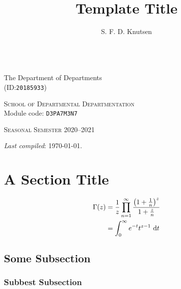\documentclass[11pt,a4paper,twoside]{article}
\title{Template Title}
\author{S. F. D. Knutsen}
\def\ID{20185933}
\begin{document}
	\thispagestyle{empty}
	\makeatletter
	\begin{titlepage}
		\begin{center}
			\vspace*{4cm}
			{\huge\scshape\@title}
			\vspace{7mm}\\
			{\Large The Department of Departments}
			\vspace{1cm}\\
			{\large\textit{\@author} ({\normalsize{ID}}:\:\texttt{\ID})}

			\vspace*{\fill}
			
			{\textsc{School of Departmental Departmentation}}
			\vspace{2mm}\\
			{\small Module code: \texttt{D3PA7M3N7}}

			\vspace*{\fill}

			{\scshape Seasonal Semester 2020--2021}

			{\small \textit{Last compiled}: {\today}.}
		\end{center}
	\end{titlepage}
	\makeatother
	\restoregeometry{}
	\newpage

	\section{A Section Title}
	\lipsum[4]
	\begin{align*}
		\Gamma(z) &= \frac{1}{z}\prod_{n=1}^{\infty}
			\frac%
				{\left(1 + \frac{1}{n}\right)^z}%
				{1 + \frac{z}{n}}\\
		&= \int_0^\infty e^{-t}t^{z-1}\,\dif t
	\end{align*}

	\lipsum[5]

	\subsection{Some Subsection}
	\lipsum[6]

	\lipsum[3][1-12]

	\subsubsection{Subbest Subsection}
	\lipsum[2][1-8]
\end{document}
